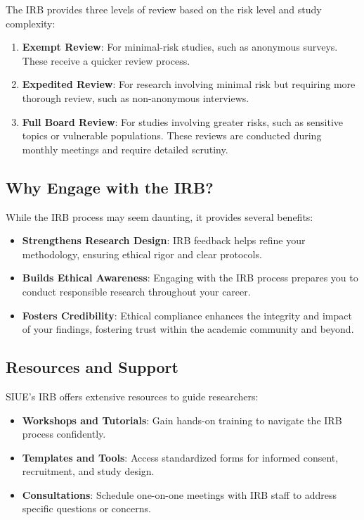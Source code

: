\documentclass[
]{book}
\providecommand{\tightlist}{%
  \setlength{\itemsep}{0pt}\setlength{\parskip}{0pt}}
\begin{document}
The IRB provides three levels of review based on the risk level and study complexity:

\begin{enumerate}
\def\labelenumi{\arabic{enumi}.}
\tightlist
\item
  \textbf{Exempt Review}: For minimal-risk studies, such as anonymous surveys. These receive a quicker review process.
\item
  \textbf{Expedited Review}: For research involving minimal risk but requiring more thorough review, such as non-anonymous interviews.
\item
  \textbf{Full Board Review}: For studies involving greater risks, such as sensitive topics or vulnerable populations. These reviews are conducted during monthly meetings and require detailed scrutiny.
\end{enumerate}

\subsection*{Why Engage with the IRB?}\label{why-engage-with-the-irb}

While the IRB process may seem daunting, it provides several benefits:

\begin{itemize}
\tightlist
\item
  \textbf{Strengthens Research Design}: IRB feedback helps refine your methodology, ensuring ethical rigor and clear protocols.
\item
  \textbf{Builds Ethical Awareness}: Engaging with the IRB process prepares you to conduct responsible research throughout your career.
\item
  \textbf{Fosters Credibility}: Ethical compliance enhances the integrity and impact of your findings, fostering trust within the academic community and beyond.
\end{itemize}

\subsection*{Resources and Support}\label{resources-and-support}

SIUE's IRB offers extensive resources to guide researchers:

\begin{itemize}
\tightlist
\item
  \textbf{Workshops and Tutorials}: Gain hands-on training to navigate the IRB process confidently.
\item
  \textbf{Templates and Tools}: Access standardized forms for informed consent, recruitment, and study design.
\item
  \textbf{Consultations}: Schedule one-on-one meetings with IRB staff to address specific questions or concerns.
\end{itemize}
\end{document}

